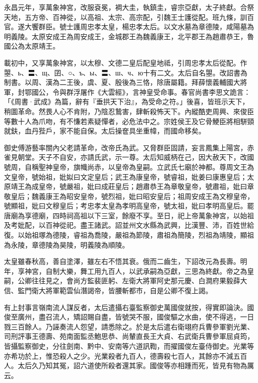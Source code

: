 \begin{pinyinscope}
 永昌元年，享萬象神宮，改服袞冕，裯大圭，執鎮圭，睿宗亞獻，太子終獻。合祭天地，五方帝、百神從，以高祖、太宗、高宗配，引魏王士護從配。班九條，訓百官。遂大饗群臣。號士護周忠孝太皇，楊忠孝太后。以文水墓為章德陵，咸陽墓為明義陵。太原安成王為周安成王，金城郡王為魏義康王，北平郡王為趙肅恭王，魯國公為太原靖王。



 載初中，又享萬象神宮，以太穆、文德二皇后配皇地祗，引周忠孝太后從配。作曌、ь、〓、щ、囝、○、ъ、ы、〓、ш、ч、ю十有二文。太后自名曌。改詔書為制書。以周、漢為二王後，虞、夏、殷後為三恪，除唐屬籍。拜薛懷義輔國大將軍，封鄂國公，令與群浮屠作《大雲經》，言神皇受命事。春官尚書李思文詭言：「《周書·武成》為篇，辭有『垂拱天下治』，為受命之符。」後喜，皆班示天下，稍圖革命。然畏人心不肯附，乃陰忍鷙害，肆斬殺怖天下。內縱酷吏周興、來俊臣等數十人為爪吻，有不慊若素疑憚者，必危法中之。宗姓侯王及它骨鯁臣將相駢頸就鈇，血丹狴戶，家不能自保。太后操奩具坐重幃，而國命移矣。



 御史傅游藝率關內父老請革命，改帝氏為武。又脅群臣固請，妄言鳳集上陽宮，赤雀見朝堂。天子不自安，亦請氏武，示一尊。太后知威柄在己，因大赦天下，改國號周，自稱聖神皇帝，旗幟尚赤，以皇帝為皇嗣。立武氏七廟於神都。尊周文王為文皇帝，號始祖，妣姒曰文定皇后；武王為康皇帝，號睿祖，妣姜曰康惠皇后；太原靖王為成皇帝，號嚴祖，妣曰成莊皇后；趙肅恭王為章敬皇帝，號肅祖，妣曰章敬皇后；魏義康王為昭安皇帝，號烈祖，妣曰昭安皇后；祖周安成王為文穆皇帝，號顯祖，妣曰文穆皇后；考忠孝太皇為孝明高皇帝，號太祖，妣曰孝明高皇后。罷唐廟為享德廟，四時祠高祖以下三室，餘廢不享。至日，祀上帝萬象神宮，以始祖及考妣配，以百神從祀。盡王諸武。詔並州文水縣為武興，比漢豐、沛，百姓世給復。以始祖塚為德陵，睿祖為喬陵，嚴祖為節陵，肅祖為簡陵，烈祖為靖陵，顯祖為永陵，章德陵為昊陵，明義陵為順陵。



 太皇雖春秋高，善自塗澤，雖左右不悟其衰。俄而二齒生，下詔改元為長壽。明年，享神宮，自制大樂，舞工用九百人，以武承嗣為亞獻，三思為終獻。帝之為皇嗣，公卿往往見之，會尚方監裴匪躬、左衛大將軍阿史那元慶、白澗府果毅薛大信、監門衛大將軍範雲仙潛謁帝，皆腰斬都市，自是公卿不復上謁。



 有上封事言嶺南流人謀反者，太后遣攝右臺監察御史萬國俊就按，得實即論決。國俊至廣州，盡召流人，矯詔賜自盡，皆號哭不服，國俊驅之水曲，使不得逃，一日戮三百餘人。乃誣奏流人怨望，請悉除之。於是太后遣右衛翊府兵曹參軍劉光業、司刑評事王德壽、苑南面監丞鮑思恭、尚輦直長王大貞、右武衛兵曹參軍屈貞筠，皆攝監察御史，分往劍南、黔中、安南等六道訊鞫，而擢國俊左臺侍御史。光業等亦希功於上，惟恐殺人之少。光業殺者九百人，德壽殺七百人，其餘亦不減五百人。太后久乃知其冤，詔六道使所殺者還其家。國俊等亦相踵而死，皆見有物為厲云。




\end{pinyinscope}
